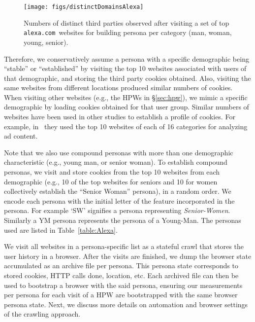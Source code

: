 \documentclass{article}
\newcommand{\hpw}{HPW\xspace}
\newcommand{\hpws}{HPWs\xspace}
\newcommand{\alexa}{\texttt{alexa.com}}
\begin{document}
\begin{figure}[t]
    \centering
    \texttt{[image: figs/distinctDomainsAlexa]}
    \caption{Numbers of distinct third parties observed after visiting a set of top \alexa\ websites for building persona per category (man, woman, young, senior).}
    \label{fig:distinctCookies}
\end{figure}


Therefore, we conservatively assume a persona with a specific demographic being ``stable'' or ``established'' by visiting the top 10 websites associated with users of that demographic, and storing the third party cookies obtained.
Also, visiting the same websites from different locations produced similar numbers of cookies.
When visiting other websites (e.g., the \hpws in \S\ref{sec:hpw}), we mimic a specific demographic by loading cookies obtained for that user group.
Similar numbers of websites have been used in other studies to establish a profile of cookies.
For example, in~\cite{lecuyer2015sunlight} they used the top 10 websites of each of 16 categories for analyzing ad content. %

Note that we also use compound personas with more than one demographic characteristic (e.g., young man, or senior woman).
To establish compound personas, we visit and store cookies from the top 10 websites from each demographic (e.g., 10 of the top websites for seniors and 10 for women collectively establish the ``Senior Woman'' persona), in a random order.
We encode each persona with the initial letter of the feature incorporated in the persona.
For example `SW' signifies a persona representing \emph{Senior-Women}.
Similarly a YM persona represents the persona of a Young-Man.
The personas used are listed in Table~\ref{table:Alexa}.

We visit all websites in a persona-specific list as a stateful crawl that stores the user history in a browser.
After the visits are finished, we dump the browser state accumulated as an archive file per persona.
This persona state corresponds to stored cookies, HTTP calls done, location, etc.
Each archived file can then be used to bootstrap a browser with the said persona, ensuring our measurements per persona for each visit of a \hpw are bootstrapped with the same browser persona state.
Next, we discuss more details on automation and browser settings of the crawling approach.
\end{document}
